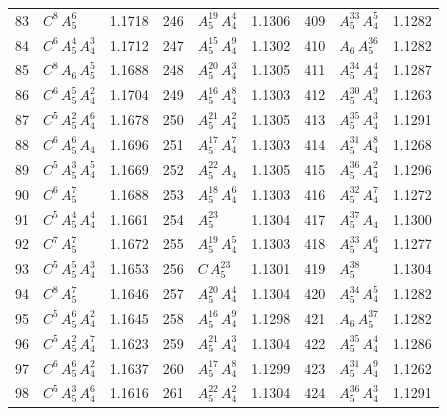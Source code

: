 \begin{longtable}{@{}rlr@{\quad}rlr@{\quad}rlr@{}}
83 & $C^{8}$\,$A_{5}^{6}$ & 1.1718 & 246 & $A_{5}^{19}$\,$A_{4}^{4}$ & 1.1306 & 409 & $A_{5}^{33}$\,$A_{4}^{5}$ & 1.1282 \\
84 & $C^{6}$\,$A_{5}^{4}$\,$A_{4}^{3}$ & 1.1712 & 247 & $A_{5}^{15}$\,$A_{4}^{9}$ & 1.1302 & 410 & $A_{6}$\,$A_{5}^{36}$ & 1.1282 \\
85 & $C^{8}$\,$A_{6}$\,$A_{5}^{5}$ & 1.1688 & 248 & $A_{5}^{20}$\,$A_{4}^{3}$ & 1.1305 & 411 & $A_{5}^{34}$\,$A_{4}^{4}$ & 1.1287 \\
86 & $C^{6}$\,$A_{5}^{5}$\,$A_{4}^{2}$ & 1.1704 & 249 & $A_{5}^{16}$\,$A_{4}^{8}$ & 1.1303 & 412 & $A_{5}^{30}$\,$A_{4}^{9}$ & 1.1263 \\
87 & $C^{5}$\,$A_{5}^{2}$\,$A_{4}^{6}$ & 1.1678 & 250 & $A_{5}^{21}$\,$A_{4}^{2}$ & 1.1305 & 413 & $A_{5}^{35}$\,$A_{4}^{3}$ & 1.1291 \\
88 & $C^{6}$\,$A_{5}^{6}$\,$A_{4}$ & 1.1696 & 251 & $A_{5}^{17}$\,$A_{4}^{7}$ & 1.1303 & 414 & $A_{5}^{31}$\,$A_{4}^{8}$ & 1.1268 \\
89 & $C^{5}$\,$A_{5}^{3}$\,$A_{4}^{5}$ & 1.1669 & 252 & $A_{5}^{22}$\,$A_{4}$ & 1.1305 & 415 & $A_{5}^{36}$\,$A_{4}^{2}$ & 1.1296 \\
90 & $C^{6}$\,$A_{5}^{7}$ & 1.1688 & 253 & $A_{5}^{18}$\,$A_{4}^{6}$ & 1.1303 & 416 & $A_{5}^{32}$\,$A_{4}^{7}$ & 1.1272 \\
91 & $C^{5}$\,$A_{5}^{4}$\,$A_{4}^{4}$ & 1.1661 & 254 & $A_{5}^{23}$ & 1.1304 & 417 & $A_{5}^{37}$\,$A_{4}$ & 1.1300 \\
92 & $C^{7}$\,$A_{5}^{7}$ & 1.1672 & 255 & $A_{5}^{19}$\,$A_{4}^{5}$ & 1.1303 & 418 & $A_{5}^{33}$\,$A_{4}^{6}$ & 1.1277 \\
93 & $C^{5}$\,$A_{5}^{5}$\,$A_{4}^{3}$ & 1.1653 & 256 & $C$\,$A_{5}^{23}$ & 1.1301 & 419 & $A_{5}^{38}$ & 1.1304 \\
94 & $C^{8}$\,$A_{5}^{7}$ & 1.1646 & 257 & $A_{5}^{20}$\,$A_{4}^{4}$ & 1.1304 & 420 & $A_{5}^{34}$\,$A_{4}^{5}$ & 1.1282 \\
95 & $C^{5}$\,$A_{5}^{6}$\,$A_{4}^{2}$ & 1.1645 & 258 & $A_{5}^{16}$\,$A_{4}^{9}$ & 1.1298 & 421 & $A_{6}$\,$A_{5}^{37}$ & 1.1282 \\
96 & $C^{5}$\,$A_{5}^{2}$\,$A_{4}^{7}$ & 1.1623 & 259 & $A_{5}^{21}$\,$A_{4}^{3}$ & 1.1304 & 422 & $A_{5}^{35}$\,$A_{4}^{4}$ & 1.1286 \\
97 & $C^{6}$\,$A_{5}^{6}$\,$A_{4}^{2}$ & 1.1637 & 260 & $A_{5}^{17}$\,$A_{4}^{8}$ & 1.1299 & 423 & $A_{5}^{31}$\,$A_{4}^{9}$ & 1.1262 \\
98 & $C^{5}$\,$A_{5}^{3}$\,$A_{4}^{6}$ & 1.1616 & 261 & $A_{5}^{22}$\,$A_{4}^{2}$ & 1.1304 & 424 & $A_{5}^{36}$\,$A_{4}^{3}$ & 1.1291 \\

\end{longtable}
